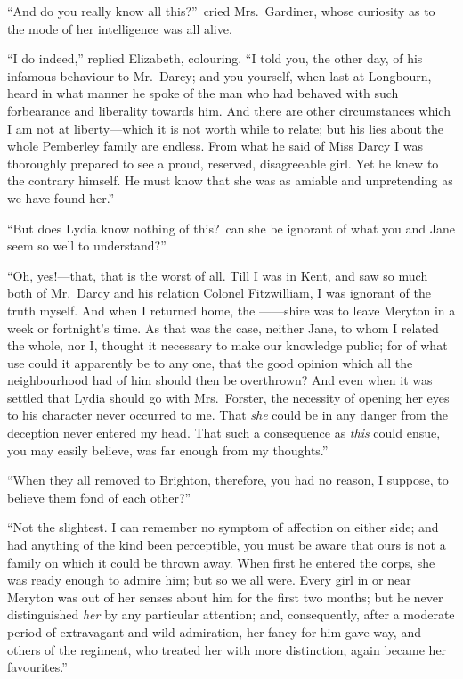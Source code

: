 \documentclass[12pt,english,oneside]{book}
\begin{document}
{}``And do you really know all this?''\ cried Mrs.\ Gardiner,
whose curiosity as to the mode of her intelligence was all alive.

{}``I do indeed,'' replied Elizabeth, colouring. {}``I told you,
the other day, of his infamous behaviour to Mr.\ Darcy; and you yourself,
when last at Longbourn, heard in what manner he spoke of the man who
had behaved with such forbearance and liberality towards him. And
there are other circumstances which I am not at liberty\mbox{---}which
it is not worth while to relate; but his lies about the whole Pemberley
family are endless. From what he said of Miss Darcy I was thoroughly
prepared to see a proud, reserved, disagreeable girl. Yet he knew
to the contrary himself. He must know that she was as amiable and
unpretending as we have found her.''

{}``But does Lydia know nothing of this?\ can she be ignorant of
what you and Jane seem so well to understand?''\ 

{}``Oh, yes!\mbox{---}that, that is the worst of all. Till I was
in Kent, and saw so much both of Mr.\ Darcy and his relation Colonel
Fitzwilliam, I was ignorant of the truth myself. And when I returned
home, the \mbox{------}shire was to leave Meryton in a week or fortnight's
time. As that was the case, neither Jane, to whom I related the whole,
nor I, thought it necessary to make our knowledge public; for of what
use could it apparently be to any one, that the good opinion which
all the neighbourhood had of him should then be overthrown? And even
when it was settled that Lydia should go with Mrs.\ Forster, the
necessity of opening her eyes to his character never occurred to me.
That \textit{she} could be in any danger from the deception never
entered my head. That such a consequence as \textit{this} could ensue,
you may easily believe, was far enough from my thoughts.''

{}``When they all removed to Brighton, therefore, you had no reason,
I suppose, to believe them fond of each other?''\ 

{}``Not the slightest. I can remember no symptom of affection on
either side; and had anything of the kind been perceptible, you must
be aware that ours is not a family on which it could be thrown away.
When first he entered the corps, she was ready enough to admire him;
but so we all were. Every girl in or near Meryton was out of her senses
about him for the first two months; but he never distinguished \textit{her}
by any particular attention; and, consequently, after a moderate period
of extravagant and wild admiration, her fancy for him gave way, and
others of the regiment, who treated her with more distinction, again
became her favourites.''
\end{document}
